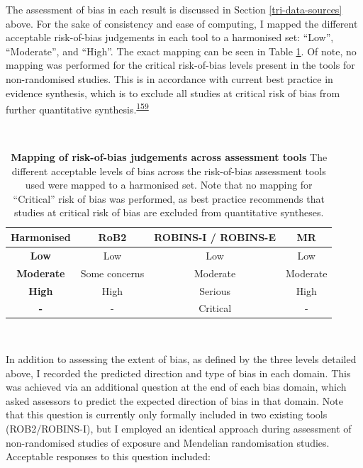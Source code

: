 \documentclass[a4paper, twoside]{templates/ociamthesis}
\begin{document}
The assessment of bias in each result is discussed in Section \ref{tri-data-sources} above. For the sake of consistency and ease of computing, I mapped the different acceptable risk-of-bias judgements in each tool to a harmonised set: ``Low'', ``Moderate'', and ``High''. The exact mapping can be seen in Table \ref{tab:robLevelsMapping-table}. Of note, no mapping was performed for the critical risk-of-bias levels present in the tools for non-randomised studies. This is in accordance with current best practice in evidence synthesis, which is to exclude all studies at critical risk of bias from further quantitative synthesis.\textsuperscript{\protect\hyperlink{ref-sterne2016}{159}}

~\\




\begin{table}[H]

\caption[Mapping of risk-of-bias judgements across assessment tools]{\label{tab:robLevelsMapping-table}\textbf{Mapping of risk-of-bias judgements across assessment tools} The different acceptable levels of bias across the risk-of-bias assessment tools used were mapped to a harmonised set. Note that no mapping for ``Critical'' risk of bias was performed, as best practice recommends that studies at critical risk of bias are excluded from quantitative syntheses.}
\centering
\begin{tabular}[t]{>{}cccc}
\toprule
\textbf{Harmonised} & \textbf{RoB2} & \textbf{ROBINS-I / ROBINS-E} & \textbf{MR}\\
\midrule
\textbf{Low} & Low & Low & Low\\
\midrule
\textbf{Moderate} & Some concerns & Moderate & Moderate\\
\midrule
\textbf{High} & High & Serious & High\\
\midrule
\textbf{-} & - & Critical & -\\
\bottomrule
\end{tabular}
\end{table}

~

In addition to assessing the extent of bias, as defined by the three levels detailed above, I recorded the predicted direction and type of bias in each domain. This was achieved via an additional question at the end of each bias domain, which asked assessors to predict the expected direction of bias in that domain. Note that this question is currently only formally included in two existing tools (ROB2/ROBINS-I), but I employed an identical approach during assessment of non-randomised studies of exposure and Mendelian randomisation studies. Acceptable responses to this question included:
\end{document}

